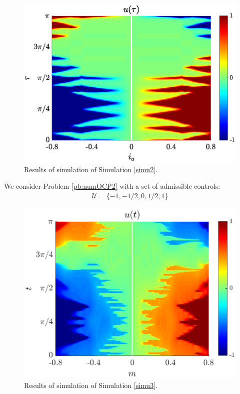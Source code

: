 \documentclass[twocolumn]{autart}    %
\begin{document}
\begin{figure}[ht!]
    \hspace{0.05em}
    \includegraphics[scale=0.525]{img/fig06.eps}
    \caption{Results of simulation of Simulation \ref{simu2}.}\label{fig:sim-bang-off-bang}
\end{figure} 

\vspace{1em}
\begin{simulation}\label{simu3}
We consider Problem \ref{pb:numOCP2} with a set of admissible controls:
\begin{align*}
    \mathcal{U} = \{-1,-1/2,0,1/2,1\}
\end{align*} 
\end{simulation}

\begin{figure}[ht!]
    \hspace{0.05em}
    \includegraphics[scale=0.525]{img/fig08.eps}
    \caption{Results of simulation of Simulation \ref{simu3}.}
    \label{fig:sim-multi-level}
\end{figure} 
\end{document}
